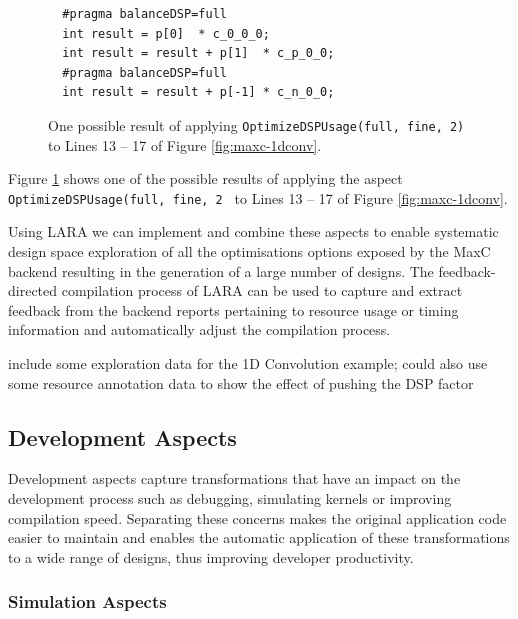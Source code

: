 \newsavebox{\secondlisting}
\begin{lrbox}{\secondlisting}%

\end{lrbox}

\begin{figure}
\begin{lstlisting}
  #pragma balanceDSP=full
  int result = p[0]  * c_0_0_0;
  int result = result + p[1]  * c_p_0_0;
  #pragma balanceDSP=full
  int result = result + p[-1] * c_n_0_0;
\end{lstlisting}
\caption{One possible result of applying
  \texttt{OptimizeDSPUsage(full, fine, 2)} to Lines 13 -- 17 of Figure
  \ref{fig:maxc-1dconv}.}
\label{fig:maxc-1dconv-aspect}
\end{figure}

Figure \ref{fig:maxc-1dconv-aspect} shows one of the possible results
of applying the aspect \texttt{OptimizeDSPUsage(full, fine, 2 } to
Lines 13 -- 17 of Figure \ref{fig:maxc-1dconv}.

Using LARA we can implement and combine these aspects to enable
systematic design space exploration of all the optimisations options
exposed by the MaxC backend resulting in the generation of a large
number of designs. The feedback-directed compilation process of LARA can
be used to capture and extract feedback from the backend reports
pertaining to resource usage or timing information and automatically
adjust the compilation process.

\TODO include some exploration data for the 1D Convolution example;
could also use some resource annotation data to show the effect of
pushing the DSP factor

\subsection{Development Aspects}

Development aspects capture transformations that have an impact on the
development process such as debugging, simulating kernels or improving
compilation speed. Separating these concerns makes the original
application code easier to maintain and enables the automatic
application of these transformations to a wide range of designs, thus
improving developer productivity.

\subsubsection{Simulation Aspects}

